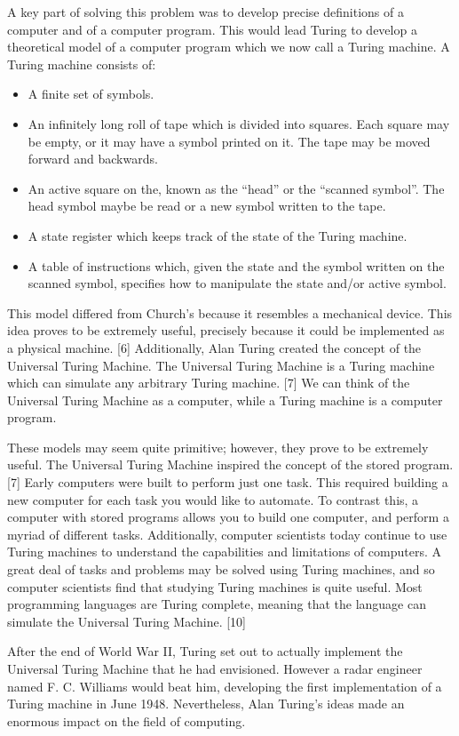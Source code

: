 \documentclass[12pt]{article}
\theoremstyle{mystyle}
\begin{document}
A key part of solving this problem was to develop precise definitions of a
computer and of a computer program. This would lead Turing to develop a
theoretical model of a computer program which we now call a Turing machine. A
Turing machine consists of:
\begin{itemize}
  \item A finite set of symbols.
  \item An infinitely long roll of tape which is divided into squares. Each
    square may be empty, or it may have a symbol printed on it. The tape may be
    moved forward and backwards.
  \item An active square on the, known as the ``head'' or the ``scanned
    symbol''. The head symbol maybe be read or a new symbol written to the tape.
  \item A state register which keeps track of the state of the Turing machine.
  \item A table of instructions which, given the state and the symbol written on
    the scanned symbol, specifies how to manipulate the state and/or active
    symbol.
\end{itemize}
This model differed from Church's because it resembles a mechanical device. This
idea proves to be extremely useful, precisely because it could be implemented as
a physical machine. [6] Additionally, Alan Turing created the concept of the
Universal Turing Machine. The Universal Turing Machine is a Turing machine which
can simulate any arbitrary Turing machine. [7] We can think of the Universal
Turing Machine as a computer, while a Turing machine is a computer program.

These models may seem quite primitive; however, they prove to be extremely
useful. The Universal Turing Machine inspired the concept of the stored program.
[7] Early computers were built to perform just one task. This required building a
new computer for each task you would like to automate. To contrast this, a
computer with stored programs allows you to build one computer, and perform a
myriad of different tasks. Additionally, computer scientists today continue to
use Turing machines to understand the capabilities and limitations of computers.
A great deal of tasks and problems may be solved using Turing machines, and so
computer scientists find that studying Turing machines is quite useful. Most
programming languages are Turing complete, meaning that the language can
simulate the Universal Turing Machine. [10]

After the end of World War II, Turing set out to actually implement the
Universal Turing Machine that he had envisioned. However a radar engineer named 
F. C. Williams would beat him, developing the first implementation of a 
Turing machine in June 1948. Nevertheless, Alan Turing's ideas made an enormous
impact on the field of computing.
\end{document}
